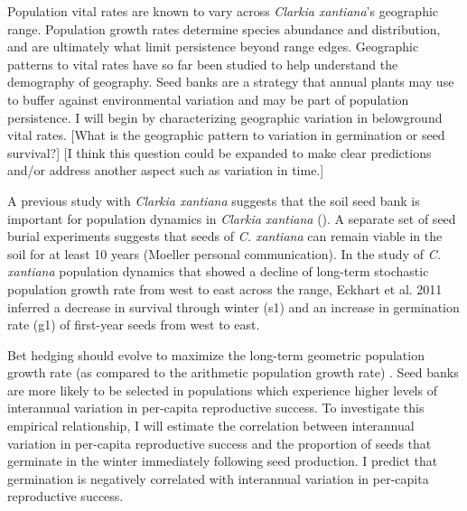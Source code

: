 \documentclass[12pt, oneside, titlepage]{article}   	%
\begin{document}

Population vital rates are known to vary across \textit{Clarkia xantiana}'s geographic range. Population growth rates determine species abundance and distribution, and are ultimately what limit persistence beyond range edges. Geographic patterns to vital rates have so far been studied to help understand the demography of geography. Seed banks are a strategy that annual plants may use to buffer against environmental variation and may be part of population persistence. I will begin by characterizing geographic variation in belowground vital rates. [What is the geographic pattern to variation in germination or seed survival?] [I think this question could be expanded to make clear predictions and/or address another aspect such as variation in time.]

A previous study with \textit{Clarkia xantiana} suggests that the soil seed bank is important for population dynamics in \textit{Clarkia xantiana} (\cite{eckhart2011}). A separate set of seed burial experiments suggests that seeds of \textit{C. xantiana} can remain viable in the soil for at least 10 years (Moeller personal communication). In the study of \textit{C. xantiana} population dynamics that showed a decline of long-term stochastic population growth rate from west to east across the range, Eckhart et al. 2011 inferred a decrease in survival through winter (s1) and an increase in germination rate (g1) of first-year seeds from west to east.

Bet hedging should evolve to maximize the long-term geometric population growth rate (as compared to the arithmetic population growth rate) \cite{cohen1966,cohen1968,ellner1985,ellner1985a}. Seed banks are more likely to be selected in populations which experience higher levels of interannual variation in per-capita reproductive success. To investigate this empirical relationship, I will estimate the correlation between interannual variation in per-capita reproductive success and the proportion of seeds that germinate in the winter immediately following seed production. I predict that germination is negatively correlated with interannual variation in per-capita reproductive success. %

\end{document}
